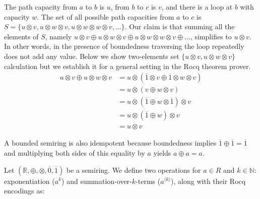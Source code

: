 \documentclass[a4paper,UKenglish,cleveref, autoref, thm-restate, anonymous]{lipics-v2021}
\begin{document}
\noindent
The path capacity from $a$ to $b$ is $u$, from $b$ to $c$ is $v$, and there is a loop at $b$ with capacity $w$. The set of all possible path capacities from $a$ to $c$ is $S = \{ u \otimes v, u \otimes w \otimes v, u \otimes w \otimes w \otimes v, \dots \}$. Our claim is that summing all the elements of $S$,  namely $u \otimes v \oplus u \otimes w \otimes v \oplus u \otimes w \otimes w \otimes v \oplus \dots$, simplifies to $u \otimes v$. In other words, in the presence of boundedness traversing the loop repeatedly does not add any value. Below we show two-elements set $\{ u \otimes v, u \otimes w \otimes v\}$ calculation but we establish it for a general 
setting in the Rocq theorem prover.
\begin{align*}
    u \otimes v \oplus u \otimes w \otimes v  
    &= u \otimes (\overline{1} \otimes v \oplus \overline{1} \otimes w \otimes v)\\
    &= u \otimes (v \oplus  w \otimes v)\\
    &=  u \otimes (\overline{1} \oplus  w \otimes \overline{1}) \otimes v \\
    &= u \otimes (\overline{1} \oplus w) \otimes v \\
    &= u \otimes v
\end{align*}


\begin{remark}
    A bounded semiring is also idempotent because boundedness implies $\overline{1} \oplus \overline{1} = \overline{1}$ and multiplying both sides of this equality by $a$ yields $a \oplus a = a$.
\end{remark}


\begin{definition}\label{def:expo}
Let  \( (\mathbb{R}, \oplus, \otimes, \overline{0}, \overline{1}) \) be a semiring. 
We define two operations for $a \in R$ and $k \in \mathbb{N}$: exponentiation ($a^k$) and 
summation-over-$k$-terms ($a^{\langle k \rangle}$), along with their Rocq encodings as:
\end{definition}
\end{document}
